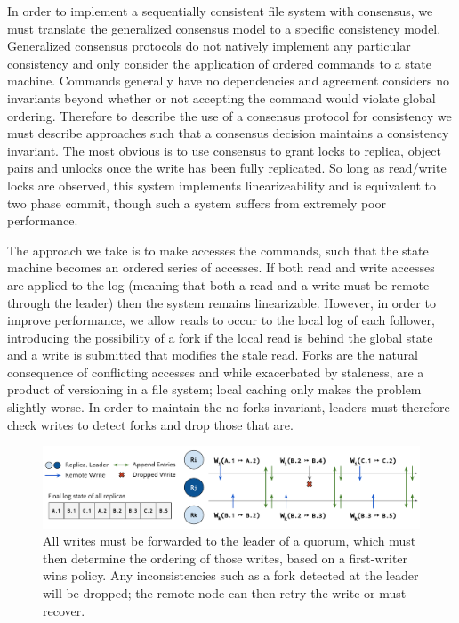 \documentclass{article}
\begin{document}
In order to implement a sequentially consistent file system with consensus, we must translate the generalized consensus model to a specific consistency model. Generalized consensus protocols do not natively implement any particular consistency and only consider the application of ordered commands to a state machine. Commands generally have no dependencies and agreement considers no invariants beyond whether or not accepting the command would violate global ordering. Therefore to describe the use of a consensus protocol for consistency we must describe approaches such that a consensus decision maintains a consistency invariant. The most obvious is to use consensus to grant locks to replica, object pairs and unlocks once the write has been fully replicated. So long as read/write locks are observed, this system implements linearizeability and is equivalent to two phase commit, though such a system suffers from extremely poor performance.

The approach we take is to make accesses the commands, such that the state machine becomes an ordered series of accesses. If both read and write accesses are applied to the log (meaning that both a read and a write must be remote through the leader) then the system remains linearizable. However, in order to improve performance, we allow reads to occur to the local log of each follower, introducing the possibility of a fork if the local read is behind the global state and a write is submitted that modifies the stale read. Forks are the natural consequence of conflicting accesses and while exacerbated by staleness, are a product of versioning in a file system; local caching only makes the problem slightly worse. In order to maintain the no-forks invariant, leaders must therefore check writes to detect forks and drop those that are.

\begin{figure}
    \centering
        \includegraphics[width=.9\textwidth]{figures/ordered}
        \caption[Sequential ordering in consensus based file system]{All writes must be forwarded to the leader of a quorum, which must then determine the ordering of those writes, based on a first-writer wins policy. Any inconsistencies such as a fork detected at the leader will be dropped; the remote node can then retry the write or must recover.}
        \label{fig:ordered}
\end{figure}
\end{document}
